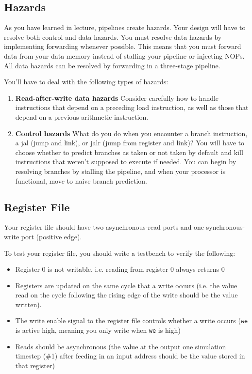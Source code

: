 \documentclass[11pt]{article}
\begin{document}
\subsection{Hazards}
As you have learned in lecture, pipelines create hazards.
Your design will have to resolve both control and data hazards.
You must resolve data hazards by implementing forwarding whenever possible.
This means that you must forward data from your data memory instead of stalling your pipeline or injecting NOPs.
All data hazards can be resolved by forwarding in a three-stage pipeline.

You'll have to deal with the following types of hazards:
\begin{enumerate}
  \item \textbf{Read-after-write data hazards} Consider carefully how to handle instructions that depend on a preceding load instruction, as well as those that depend on a previous arithmetic instruction.
  \item \textbf{Control hazards} What do you do when you encounter a branch instruction, a jal (jump and link), or jalr (jump from register and link)?
    You will have to choose whether to predict branches as taken or not taken by default and kill instructions that weren't supposed to execute if needed.
    You can begin by resolving branches by stalling the pipeline, and when your processor is functional, move to naive branch prediction.
\end{enumerate}

\subsection{Register File}
\label{reg_file}
Your register file should have two asynchronous-read ports and one synchronous-write port (positive edge).

To test your register file, you should write a testbench to verify the following:
\begin{itemize}
  \item Register 0 is not writable, i.e. reading from register 0 always returns 0
  \item Registers are updated on the same cycle that a write occurs (i.e. the value read on the cycle following the rising edge of the write should be the value written).
  \item The write enable signal to the register file controls whether a write occurs (\verb|we| is active high, meaning you only write when \verb|we| is high)
  \item Reads should be asynchronous (the value at the output one simulation timestep (\#1) after feeding in an input address should be the value stored in that register)
\end{itemize}
\end{document}
